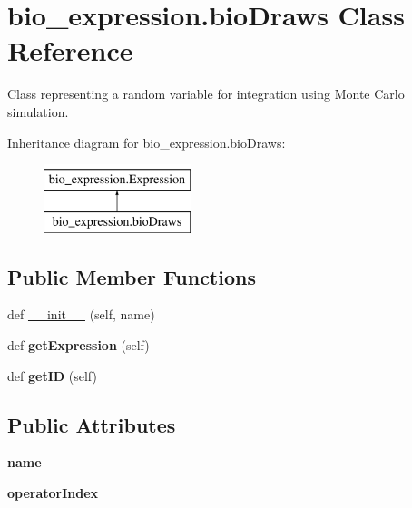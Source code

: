 \hypertarget{classbio__expression_1_1bio_draws}{}\section{bio\+\_\+expression.\+bio\+Draws Class Reference}
\label{classbio__expression_1_1bio_draws}


Class representing a random variable for integration using Monte Carlo simulation.  


Inheritance diagram for bio\+\_\+expression.\+bio\+Draws\+:\begin{figure}[H]
\begin{center}
\leavevmode
\includegraphics[height=2.000000cm]{classbio__expression_1_1bio_draws}
\end{center}
\end{figure}
\subsection*{Public Member Functions}
\begin{DoxyCompactItemize}
\item 
def \hyperlink{classbio__expression_1_1bio_draws_ad497badba81025c6b07c249ee7c67b40}{\+\_\+\+\_\+init\+\_\+\+\_\+} (self, name)
\item 
def {\bfseries get\+Expression} (self)\hypertarget{classbio__expression_1_1bio_draws_a81608da0f3594d3841532c3dd47103a9}{}\label{classbio__expression_1_1bio_draws_a81608da0f3594d3841532c3dd47103a9}

\item 
def {\bfseries get\+ID} (self)\hypertarget{classbio__expression_1_1bio_draws_a34df4ab16919f9007f1a26948fc1be17}{}\label{classbio__expression_1_1bio_draws_a34df4ab16919f9007f1a26948fc1be17}

\end{DoxyCompactItemize}
\subsection*{Public Attributes}
\begin{DoxyCompactItemize}
\item 
{\bfseries name}\hypertarget{classbio__expression_1_1bio_draws_aaa8e40ffe379b1f318f406d05ae01564}{}\label{classbio__expression_1_1bio_draws_aaa8e40ffe379b1f318f406d05ae01564}

\item 
{\bfseries operator\+Index}\hypertarget{classbio__expression_1_1bio_draws_a4343ef52b5eb0a7ff0f62125618d96e9}{}\label{classbio__expression_1_1bio_draws_a4343ef52b5eb0a7ff0f62125618d96e9}

\end{DoxyCompactItemize}


